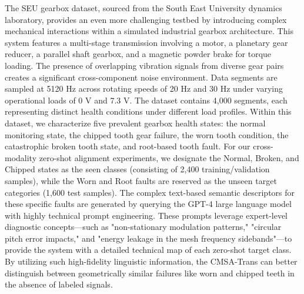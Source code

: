 The SEU gearbox dataset, sourced from the South East University dynamics laboratory, provides an even more challenging testbed by introducing complex mechanical interactions within a simulated industrial gearbox architecture. This system features a multi-stage transmission involving a motor, a planetary gear reducer, a parallel shaft gearbox, and a magnetic powder brake for torque loading. The presence of overlapping vibration signals from diverse gear pairs creates a significant cross-component noise environment. Data segments are sampled at 5120 Hz across rotating speeds of 20 Hz and 30 Hz under varying operational loads of 0 V and 7.3 V. The dataset contains 4,000 segments, each representing distinct health conditions under different load profiles. Within this dataset, we characterize five prevalent gearbox health states: the normal monitoring state, the chipped tooth gear failure, the worn tooth condition, the catastrophic broken tooth state, and root-based tooth fault. For our cross-modality zero-shot alignment experiments, we designate the Normal, Broken, and Chipped states as the seen classes (consisting of 2,400 training/validation samples), while the Worn and Root faults are reserved as the unseen target categories (1,600 test samples). The complex text-based semantic descriptors for these specific faults are generated by querying the GPT-4 large language model with highly technical prompt engineering. These prompts leverage expert-level diagnostic concepts—such as "non-stationary modulation patterns," "circular pitch error impacts," and "energy leakage in the mesh frequency sidebands"—to provide the system with a detailed technical map of each zero-shot target class. By utilizing such high-fidelity linguistic information, the CMSA-Trans can better distinguish between geometrically similar failures like worn and chipped teeth in the absence of labeled signals.


